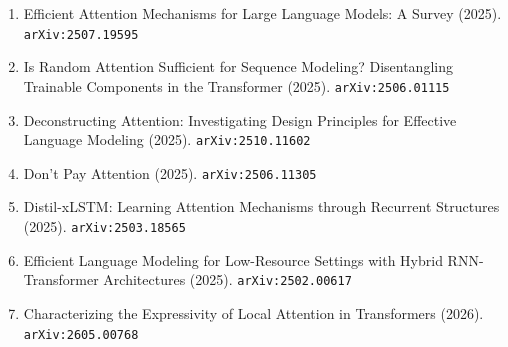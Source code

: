 \documentclass[11pt]{article}
\begin{document}
\begin{enumerate}
  \item Efficient Attention Mechanisms for Large Language Models: A Survey (2025). \texttt{arXiv:2507.19595}
  \item Is Random Attention Sufficient for Sequence Modeling? Disentangling Trainable Components in the Transformer (2025). \texttt{arXiv:2506.01115}
  \item Deconstructing Attention: Investigating Design Principles for Effective Language Modeling (2025). \texttt{arXiv:2510.11602}
  \item Don't Pay Attention (2025). \texttt{arXiv:2506.11305}
  \item Distil-xLSTM: Learning Attention Mechanisms through Recurrent Structures (2025). \texttt{arXiv:2503.18565}
  \item Efficient Language Modeling for Low-Resource Settings with Hybrid
  RNN-Transformer Architectures (2025). \texttt{arXiv:2502.00617}
  \item Characterizing the Expressivity of Local Attention in Transformers (2026). \texttt{arXiv:2605.00768}
\end{enumerate}
\end{document}
